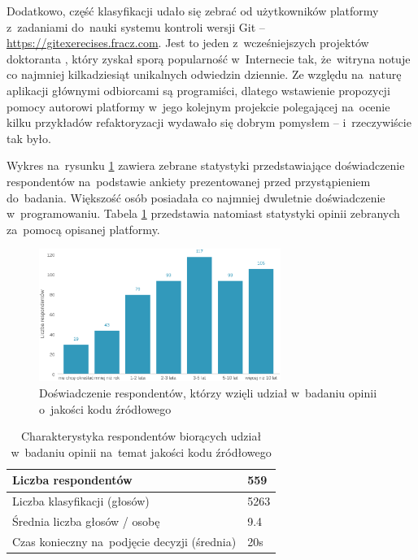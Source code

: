 \documentclass[twoside]{praca}
\begin{document}
Dodatkowo, część klasyfikacji udało się zebrać od użytkowników platformy z~zadaniami do~nauki systemu kontroli wersji Git -- \url{https://gitexerecises.fracz.com}. Jest to jeden z~wcześniejszych projektów doktoranta \cite{fracz2015empirical}, który zyskał sporą popularność w~Internecie tak, że~witryna notuje co najmniej kilkadziesiąt unikalnych odwiedzin dziennie. Ze względu na~naturę aplikacji głównymi odbiorcami są programiści, dlatego wstawienie propozycji pomocy autorowi platformy w~jego kolejnym projekcie polegającej na~ocenie kilku przykładów refaktoryzacji wydawało się dobrym pomysłem -- i~rzeczywiście tak było.

Wykres na~rysunku \ref{fig:impl:codefracz-respondents-experience} zawiera zebrane statystyki przedstawiające doświadczenie respondentów na~podstawie ankiety prezentowanej przed przystąpieniem do~badania. Większość osób posiadała co najmniej dwuletnie doświadczenie w~programowaniu. Tabela \ref{tbl:impl:codefracz-respondents} przedstawia natomiast statystyki opinii zebranych za~pomocą opisanej platformy.

\begin{figure}[h]
\centering
\includegraphics[width=0.7\textwidth]{impl/codefracz-respondents-experience.eps}
\caption{Doświadczenie respondentów, którzy wzięli udział w~badaniu opinii o~jakości kodu źródłowego}
\label{fig:impl:codefracz-respondents-experience}
\end{figure}

\begin{table}[h]
\centering
\caption{Charakterystyka respondentów biorących udział w~badaniu opinii na~temat jakości kodu źródłowego}
\label{tbl:impl:codefracz-respondents}
\begin{tabular}{|l|l|}
  \hline 
  Liczba respondentów & 559 \\ \hline
  Liczba klasyfikacji (głosów) & 5263 \\ \hline
  Średnia liczba głosów / osobę & 9.4 \\ \hline
  Czas konieczny na~podjęcie decyzji (średnia) & 20s \\ \hline
\end{tabular} 
\end{table}
\end{document}
